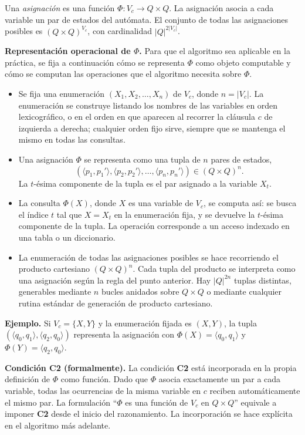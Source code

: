 \documentclass[11pt, letterpaper]{article}
\theoremstyle{definition}
\newcommand{\pair}[2]{\langle #1, #2 \rangle}
\begin{document}
Una \emph{asignación} es una función $\Phi : V_c \to Q \times Q$. La asignación asocia a cada variable un par de estados del autómata. El conjunto de todas las asignaciones posibles es $(Q \times Q)^{V_c}$, con cardinalidad $|Q|^{2 |V_c|}$.

\textbf{Representación operacional de $\Phi$.} Para que el algoritmo sea aplicable en la práctica, se fija a continuación cómo se representa $\Phi$ como objeto computable y cómo se computan las operaciones que el algoritmo necesita sobre $\Phi$.

\begin{itemize}
\item Se fija una enumeración $(X_1, X_2, \dots, X_n)$ de $V_c$, donde $n = |V_c|$. La enumeración se construye listando los nombres de las variables en orden lexicográfico, o en el orden en que aparecen al recorrer la cláusula $c$ de izquierda a derecha; cualquier orden fijo sirve, siempre que se mantenga el mismo en todas las consultas.

\item Una asignación $\Phi$ se representa como una tupla de $n$ pares de estados,
\[
(\pair{p_1}{p_1'}, \pair{p_2}{p_2'}, \dots, \pair{p_n}{p_n'}) \in (Q \times Q)^n.
\]
La $t$-ésima componente de la tupla es el par asignado a la variable $X_t$.

\item La consulta $\Phi(X)$, donde $X$ es una variable de $V_c$, se computa así: se busca el índice $t$ tal que $X = X_t$ en la enumeración fija, y se devuelve la $t$-ésima componente de la tupla. La operación corresponde a un acceso indexado en una tabla o un diccionario.

\item La enumeración de todas las asignaciones posibles se hace recorriendo el producto cartesiano $(Q \times Q)^n$. Cada tupla del producto se interpreta como una asignación según la regla del punto anterior. Hay $|Q|^{2n}$ tuplas distintas, generables mediante $n$ bucles anidados sobre $Q \times Q$ o mediante cualquier rutina estándar de generación de producto cartesiano.
\end{itemize}

\textbf{Ejemplo.} Si $V_c = \{X, Y\}$ y la enumeración fijada es $(X, Y)$, la tupla $(\pair{q_0}{q_1}, \pair{q_2}{q_0})$ representa la asignación con $\Phi(X) = \pair{q_0}{q_1}$ y $\Phi(Y) = \pair{q_2}{q_0}$.

\textbf{Condición \textbf{C2} (formalmente).} La condición \textbf{C2} está incorporada en la propia definición de $\Phi$ como función. Dado que $\Phi$ asocia exactamente un par a cada variable, todas las ocurrencias de la misma variable en $c$ reciben automáticamente el mismo par. La formulación ``$\Phi$ es una función de $V_c$ en $Q \times Q$'' equivale a imponer \textbf{C2} desde el inicio del razonamiento. La incorporación se hace explícita en el algoritmo más adelante.
\end{document}
